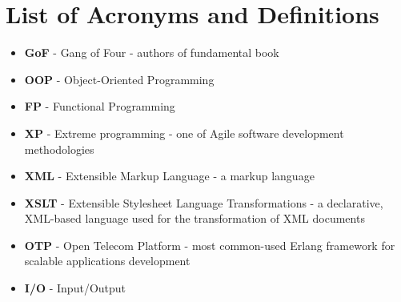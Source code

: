 \chapter{List of Acronyms and Definitions}
\label{apdx:apxa}

\begin{itemize}
    \item \textbf{GoF} - Gang of Four - authors of fundamental book ~\cite{res13}
    \item \textbf{OOP} - Object-Oriented Programming
    \item \textbf{FP} - Functional Programming
    \item \textbf{XP} - Extreme programming - one of Agile software development methodologies
    \item \textbf{XML} - Extensible Markup Language - a markup language
    \item \textbf{XSLT} - Extensible Stylesheet Language Transformations - a declarative, XML-based language used for the transformation of XML documents
    \item \textbf{OTP} - Open Telecom Platform - most common-used Erlang framework for scalable applications development
    \item \textbf{I/O} - Input/Output
\end{itemize}